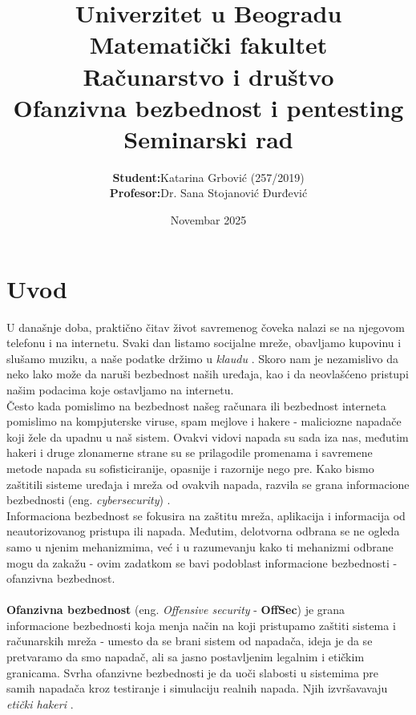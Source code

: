 \documentclass[a4paper,12pt]{article}
\title{%
\sffamily
\Large Univerzitet u Beogradu\\
\large Matematički fakultet\\[0.8em]
\textbf{Računarstvo i društvo}\\[1.2em]
\LARGE{Ofanzivna bezbednost i pentesting}\\
\large Seminarski rad\\[0.6em]

}
\author{%
\sffamily
\begin{tabular}{@{}ll@{}}
\textbf{Student:} & Katarina Grbović (257/2019) \\
\textbf{Profesor:} & Dr. Sana Stojanović Đurđević \\
\end{tabular}
}
\date{\sffamily Novembar 2025}
\begin{document}
\maketitle
\newpage
\tableofcontents
\newpage

\section{Uvod}

U današnje doba, praktično čitav život savremenog čoveka nalazi se na njegovom telefonu i na internetu. Svaki dan listamo socijalne mreže, obavljamo kupovinu i slušamo muziku, a naše podatke držimo u \textit{klaudu} \cite{klaud}. Skoro nam je nezamislivo da neko lako može da naruši bezbednost naših uređaja, kao i da neovlašćeno pristupi našim podacima koje ostavljamo na internetu. \\
Često kada pomislimo na bezbednost našeg računara ili bezbednost interneta pomislimo na kompjuterske viruse, spam mejlove i hakere - maliciozne napadače koji žele da upadnu u naš sistem. Ovakvi vidovi napada su sada iza nas, međutim hakeri i druge zlonamerne strane su se prilagodile promenama i savremene metode napada su sofisticiranije, opasnije i razornije nego pre. 
Kako bismo zaštitili sisteme uređaja i mreža od ovakvih napada, razvila se grana informacione bezbednosti (eng. \textit{cybersecurity}) \cite{cybersec}. \\ 
Informaciona bezbednost se fokusira na zaštitu mreža, aplikacija i informacija od neautorizovanog pristupa ili napada. Međutim, delotvorna odbrana se ne ogleda samo u njenim mehanizmima, već i u razumevanju kako ti mehanizmi odbrane mogu da zakažu - ovim zadatkom se bavi podoblast informacione bezbednosti - ofanzivna bezbednost. 
\\
\\
\textbf{Ofanzivna bezbednost}  (eng. \textit{Offensive security} - \textbf{OffSec}) je grana informacione bezbednosti koja menja način na koji pristupamo zaštiti sistema i računarskih mreža - umesto da se brani sistem od napadača, ideja je da se pretvaramo da smo napadač, ali sa jasno postavljenim legalnim i etičkim granicama. Svrha ofanzivne bezbednosti je da uoči slabosti u sistemima pre samih napadača kroz testiranje i simulaciju realnih napada. Njih izvršavavaju \textit{etički hakeri} 
\cite{ibm_offensive_security}. \\
\end{document}
